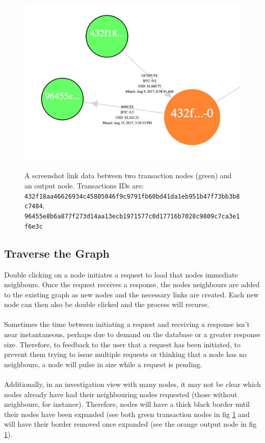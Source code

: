 \begin{figure}[h!]
  \centering
  \includegraphics[width = 15cm]{./figures/ui-screenshots/link-data}\\[0.5cm] 
  \caption{A screenshot link data between two transaction nodes (green) and an output node. 
  Transactions IDs are: \texttt{432f18aa46626934c45805046f9c9791fb60bd41da1eb951b47f73bb3b8c7484},\\\texttt{96455e8b6a877f273d14aa13ecb1971577c0d17716b7028c9809c7ca3e1f6e3c}}
  \label{fig:link-data}
\end{figure}

\subsection{Traverse the Graph}
Double clicking on a node initiates a request to load that nodes immediate neighbours. Once the request receives a response, the nodes neighbours are added to the existing graph as new nodes and the necessary links are created. Each new node can then also be double clicked and the process will recurse. 
\\\\
Sometimes the time between initiating a request and receiving a response isn't near instantaneous, perhaps due to demand on the database or a greater response size. Therefore, to feedback to the user that a request has been initiated, to prevent them trying to issue multiple requests or thinking that a node has no neighbours, a node will pulse in size while a request is pending. 
\\\\
Additionally, in an investigation view with many nodes, it may not be clear which nodes already have had their neighbouring nodes requested (those without neighbours, for instance). Therefore, nodes will have a thick black border until their nodes have been expanded (see both green transaction nodes in fig \ref{fig:link-data} and will have their border removed once expanded (see the orange output node in fig \ref{fig:link-data}).

